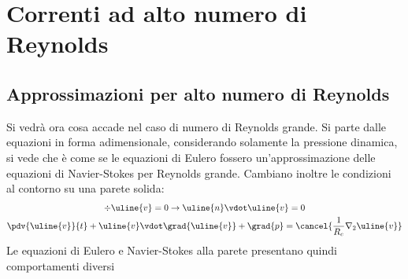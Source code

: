 %
\section{Correnti ad alto numero di Reynolds}
\subsection{Approssimazioni per alto numero di Reynolds}
Si vedrà ora cosa accade nel caso di numero di Reynolds grande.
Si parte dalle equazioni in forma adimensionale, considerando solamente la pressione dinamica, si vede che è come se le equazioni di Eulero fossero un'approssimazione delle equazioni di Navier-Stokes per Reynolds grande.
Cambiano inoltre le condizioni al contorno su una parete solida:
%
	\begin{equation*}
		\begin{gathered}
			\div{\uline{v}} = 0 \rightarrow \uline{n} \vdot \uline{v} = 0\\
			\pdv{\uline{v}}{t} + \uline{v} \vdot \grad{\uline{v}} + \grad{p} = \cancel{\frac{1}{R_e} \nabla_2 \uline{v}}
		\end{gathered}
	\end{equation*}
%
Le equazioni di Eulero e Navier-Stokes alla parete presentano quindi comportamenti diversi

